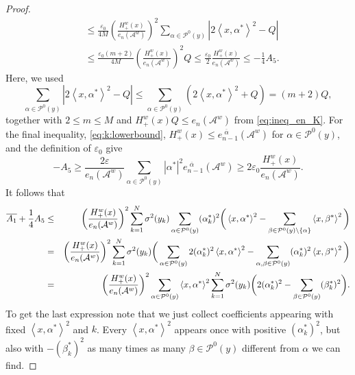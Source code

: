 \documentclass{article}
\numberwithin{equation}{section}
\newcommand{\Aa}{\mathcal{A}^{w}}
\newcommand{\xas}{\left<x,\alpha^*\right>}
\newcommand{\xbs}{\left<x,\beta^*\right>}
\newcommand{\SaPz}{\sum_{\alpha\in\Pzero}}
\newcommand{\SbPzna}{\sum_{\beta\in\Pzero\backslash\{\alpha\}}}
\newcommand{\SabPz}{\sum_{\alpha,\beta\in\Pzero}}
\newcommand{\shift}{\,\,}
\newcommand{\eA}[1]{e_{#1}(\Aa)}
\newcommand{\eaA}[1]{e_{#1}^{\shift\overline{\alpha}}(\Aa)}
\newcommand{\Pzero}{\mathcal{P}^0(y)}
\theoremstyle{plain}
\begin{document}
\begin{proof}
\begin{align*}
    &\leq \frac{\varepsilon_0}{4M}\left(\frac{H_+^w(x)}{\eA{n}}\right)^2 \sum_{\alpha\in\Pzero}|2\xas^2-Q|\\
    &\leq \frac{\varepsilon_0(m+2)}{4M} \left(\frac{H_+^w(x)}{\eA{n}}\right)^2Q \leq \frac{\varepsilon_0}{2} \frac{H_+^w(x)}{\eA{n}} \leq-\frac14 A_5.
\end{align*}
Here, we used
    \begin{equation*}
        \sum_{\alpha\in\Pzero}|2\xas^2-Q| \leq\sum_{\alpha\in\Pzero}(2\xas^2+Q) =(m+2)Q,
    \end{equation*}
together with $2\leq m\leq M$ and $H_+^w(x)Q\leq\eA{n}$ from \eqref{eq:ineq_en_K}. For the final inequality, \ref{eq:k:lowerbound}, $H_+^w(x)\leq\eaA{n-1}$ for $\alpha\in\Pzero$, and the definition of $\varepsilon_0$ give
    \begin{equation*}
        -A_5 \geq \frac{2\varepsilon}{\eA{n}} \sum_{\alpha\in\Pzero}|\alpha^*|^2\eaA{n-1} \geq 2\varepsilon_0\frac{H_+^w(x)}{\eA{n}}.
    \end{equation*}
It follows that
    \begin{eqnarray*}
        \overline{A_1}+\frac{1}{4}A_5 &\leq& \left(\frac{H^w_+(x)}{\eA{n}}\right)^2 \sum_{k=1}^N \sigma^2(y_k)\SaPz(\alpha_k^*)^2   \bigg(\xas^2-\SbPzna\xbs^2\bigg)\\
        &=&\left(\frac{H^w_+(x)}{\eA{n}}\right)^2 \sum_{k=1}^N \sigma^2(y_k)  \bigg(\SaPz 2(\alpha_k^*)^2 \xas^2-\SabPz(\alpha_k^*)^2 \xbs^2\bigg)\\
        &=& \bigg(\frac{H^w_+(x)}{\eA{n}}\bigg)^2 \sum_{\alpha\in\Pzero} \xas^2 \sum_{k=1}^N \sigma^2(y_k)\bigg(2(\alpha_k^*)^2-\sum_{\beta\in\Pzero}(\beta_k^*)^2\bigg)\/.
    \end{eqnarray*}
    To get the last expression note that we just collect coefficients appearing with fixed $\xas^2$ and $k$. Every $\xas^2$ appears once with positive $(\alpha_k^*)^2$, but also with $-(\beta_k^*)^2$ as many times as many $\beta\in \Pzero$ different from $\alpha$ we can find.
    

\end{proof}
\end{document}
